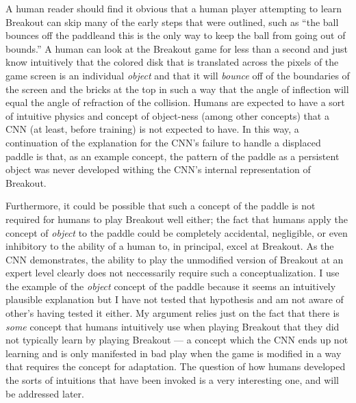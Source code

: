 \documentclass{article}
\renewcommand{\it}{\textit}
\begin{document}
A human reader should find it obvious that a human player attempting to learn Breakout can skip many of the early steps that were outlined, such as ``the ball bounces off the paddleand this is the only way to keep the ball from going out of bounds.''
A human can look at the Breakout game for less than a second and just know intuitively that the colored disk that is translated across the pixels of the game screen is an individual \it{object} and that it will \it{bounce} off of the boundaries of the screen and the bricks at the top in such a way that the angle of inflection will equal the angle of refraction of the collision.
Humans are expected to have a sort of intuitive physics and concept of object-ness (among other concepts) that a CNN (at least, before training) is not expected to have.
In this way, a continuation of the explanation for the CNN's failure to handle a displaced paddle is that, as an example concept, the pattern of the paddle as a persistent object was never developed withing the CNN's internal representation of Breakout.

Furthermore, it could be possible that such a concept of the paddle is not required for humans to play Breakout well either; the fact that humans apply the concept of \it{object} to the paddle could be completely accidental, negligible, or even inhibitory to the ability of a human to, in principal, excel at Breakout.
As the CNN demonstrates, the ability to play the unmodified version of Breakout at an expert level clearly does not neccessarily require such a conceptualization.
I use the example of the \it{object} concept of the paddle because it seems an intuitively plausible explanation but I have not tested that hypothesis and am not aware of other's having tested it either. My argument relies just on the fact that there is \it{some} concept that humans intuitively use when playing Breakout that they did not typically learn by playing Breakout --- a concept which the CNN ends up not learning and is only manifested in bad play when the game is modified in a way that requires the concept for adaptation.
The question of how humans developed the sorts of intuitions that have been invoked is a very interesting one, and will be addressed later.
\end{document}
